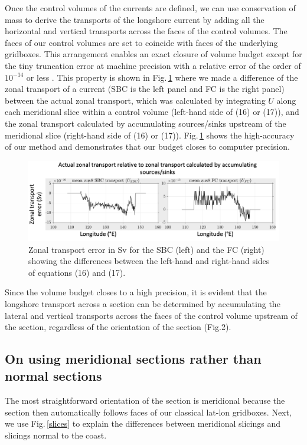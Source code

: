 \documentclass[preprint,3p,review,12pt]{elsarticle}
\begin{document}
Once the control volumes of the currents are defined, we can use conservation of mass to derive the transports of the longshore current by adding all the horizontal and vertical transports across the faces of the control volumes. The faces of our control volumes are set to coincide with faces of the underlying gridboxes. This arrangement enables an exact closure of volume budget except for the tiny truncation error at machine precision with a relative error of the order of $10^{-14}$ or less
\citep{Furue2019}. This property is shown in Fig.\,\ref{Slide1_2} where we made a difference of the zonal transport of a current (SBC is the left panel and FC is the right panel) between the actual zonal transport, which was calculated by integrating $U$ along each meridional slice within a control volume (left-hand side of (16) or (17)), and the zonal transport calculated by accumulating sources/sinks upstream of the meridional slice (right-hand side of (16) or (17)). Fig.\,\ref{Slide1_2} shows the high-accuracy of our method and demonstrates that our budget closes to computer precision.
%
\begin{figure}[tb]
    \includegraphics[width=1\textwidth, height=1\textheight, keepaspectratio]{Slide1_2.jpg}
    \caption{\label{Slide1_2}%
    Zonal transport error in Sv for the SBC (left) and the FC (right) showing the differences between the left-hand and right-hand sides of equations (16) and (17).}
\end{figure}

Since the volume budget closes to a high precision, it is evident that the longshore transport across a section can be determined by accumulating the lateral and vertical transports across the faces of the control volume upstream of the section, regardless of the orientation of the section (Fig.2).

\subsection{On using meridional sections rather than normal sections}
The most straightforward orientation of the section is meridional because the section then automatically follows faces of our classical lat-lon gridboxes. Next, we use Fig.\,\ref{slices} to explain the differences between meridional slicings and slicings normal to the coast.
\end{document}
